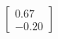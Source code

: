 \documentclass[preview]{standalone}
\begin{document}
\begin{align*}
\begin{bmatrix} 0.67 \\ -0.20 \end{bmatrix}
\end{align*}
\end{document}
